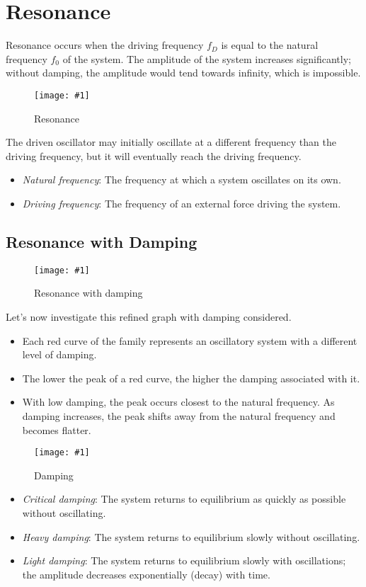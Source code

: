 \documentclass[a4paper,12pt]{article}
\let\oldsection\section
\renewcommand\section{\clearpage\oldsection}
\newcommand{\img}[4]{\begin{center}
  \begin{figure}[H]
    \centering
    \texttt{[image: \#1]}
    \caption{#3}
    \label{fig:#4}
  \end{figure}
\end{center}}
\begin{document}
\section{Resonance}

Resonance occurs when the driving frequency $f_D$ is equal to the natural frequency $f_0$ of the system. The amplitude of the system increases significantly; without damping, the amplitude would tend towards infinity, which is impossible.
\img{resonance.png}{0.4}{Resonance}{resonance}
The driven oscillator may initially oscillate at a different frequency than the driving frequency, but it will eventually reach the driving frequency.
\begin{itemize}
  \item \textit{Natural frequency}: The frequency at which a system oscillates on its own.
  \item \textit{Driving frequency}: The frequency of an external force driving the system.
\end{itemize}
\pagebreak

\subsection{Resonance with Damping}

\img{resonancewithdamping.png}{0.4}{Resonance with damping}{resonancewithdamping}
Let's now investigate this refined graph with damping considered.
\begin{itemize}
  \item Each red curve of the family represents an oscillatory system with a different level of damping.
  \item The lower the peak of a red curve, the higher the damping associated with it.
  \item With low damping, the peak occurs closest to the natural frequency. As damping increases, the peak shifts away from the natural frequency and becomes flatter.
\end{itemize}

\pagebreak

\img{damping.png}{0.6}{Damping}{damping}

\begin{itemize}
  \item \textit{Critical damping}: The system returns to equilibrium as quickly as possible without oscillating.
  \item \textit{Heavy damping}: The system returns to equilibrium slowly without oscillating.
  \item \textit{Light damping}: The system returns to equilibrium slowly with oscillations; the amplitude decreases exponentially (decay) with time.
\end{itemize}
\end{document}

